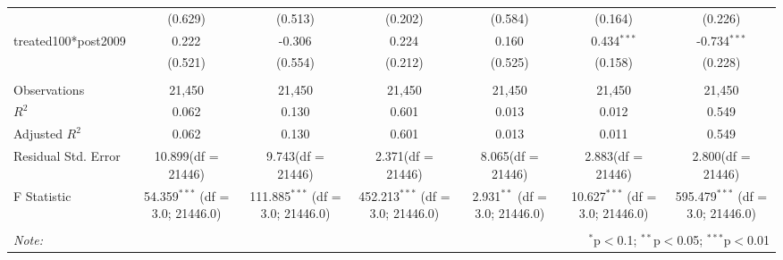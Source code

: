 \documentclass[12pt]{article}
\begin{document}
\begin{table}[!htbp]
\begin{tabular}{@{\extracolsep{5pt}}lcccccc}
  & (0.629) & (0.513) & (0.202) & (0.584) & (0.164) & (0.226) \\
 treated100*post2009 & 0.222$^{}$ & -0.306$^{}$ & 0.224$^{}$ & 0.160$^{}$ & 0.434$^{***}$ & -0.734$^{***}$ \\
  & (0.521) & (0.554) & (0.212) & (0.525) & (0.158) & (0.228) \\
\hline \\[-1.8ex]
 Observations & 21,450 & 21,450 & 21,450 & 21,450 & 21,450 & 21,450 \\
 $R^2$ & 0.062 & 0.130 & 0.601 & 0.013 & 0.012 & 0.549 \\
 Adjusted $R^2$ & 0.062 & 0.130 & 0.601 & 0.013 & 0.011 & 0.549 \\
 Residual Std. Error & 10.899(df = 21446) & 9.743(df = 21446) & 2.371(df = 21446) & 8.065(df = 21446) & 2.883(df = 21446) & 2.800(df = 21446)  \\
 F Statistic & 54.359$^{***}$ (df = 3.0; 21446.0) & 111.885$^{***}$ (df = 3.0; 21446.0) & 452.213$^{***}$ (df = 3.0; 21446.0) & 2.931$^{**}$ (df = 3.0; 21446.0) & 10.627$^{***}$ (df = 3.0; 21446.0) & 595.479$^{***}$ (df = 3.0; 21446.0) \\
\hline
\hline \\[-1.8ex]
\textit{Note:} & \multicolumn{6}{r}{$^{*}$p$<$0.1; $^{**}$p$<$0.05; $^{***}$p$<$0.01} \\
\end{tabular}
\end{table}
\end{document}
